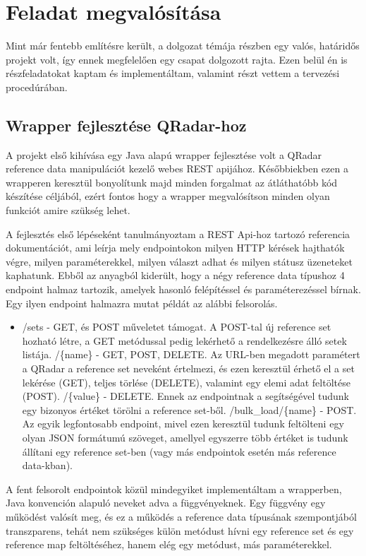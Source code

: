 \chapter{Feladat megvalósítása}
\label{ch:imp}
Mint már fentebb említésre került, a dolgozat témája részben egy valós, határidős projekt volt, így ennek megfelelően egy csapat dolgozott rajta. Ezen belül én is részfeladatokat kaptam és implementáltam, valamint részt vettem a tervezési procedúrában. 

\section{Wrapper fejlesztése QRadar-hoz}
A projekt első kihívása egy Java alapú wrapper fejlesztése volt a QRadar reference data manipulációt kezelő webes REST apijához. Későbbiekben ezen a wrapperen keresztül bonyolítunk majd minden forgalmat az átláthatóbb kód készítése céljából, ezért fontos hogy a wrapper megvalósítson minden olyan funkciót amire szükség lehet.

A fejlesztés első lépéseként tanulmányoztam a REST Api-hoz tartozó referencia dokumentációt, ami leírja mely endpointokon milyen HTTP kérések hajthatók végre, milyen paraméterekkel, milyen választ adhat és milyen státusz üzeneteket kaphatunk. Ebből az anyagból kiderült, hogy a négy reference data típushoz 4 endpoint halmaz tartozik, amelyek hasonló felépítéssel és paraméterezéssel bírnak. Egy ilyen endpoint halmazra mutat példát az alábbi felsorolás.

\begin{itemize}
	\item /sets - GET, és POST műveletet támogat. A POST-tal új reference set hozható létre, a GET metódussal pedig lekérhető a rendelkezésre álló setek listája.
		\subitem /\{name\} - GET, POST, DELETE. Az URL-ben megadott paramétert a QRadar a reference set neveként értelmezi, és ezen keresztül érhető el a set lekérése (GET), teljes törlése (DELETE), valamint egy elemi adat feltöltése (POST).
			\subsubitem /\{value\} - DELETE. Ennek az endpointnak a segítségével tudunk egy bizonyos értéket törölni a reference set-ből.
		\subitem /bulk\_load/\{name\} - POST. Az egyik legfontosabb endpoint, mivel ezen keresztül tudunk feltölteni egy olyan JSON formátumú szöveget, amellyel egyszerre több értéket is tudunk állítani egy reference set-ben (vagy más endpointok esetén más reference data-kban).
\end{itemize}

A fent felsorolt endpointok közül mindegyiket implementáltam a wrapperben, Java konvención alapuló neveket adva  a függvényeknek. Egy függvény egy működést valósít meg, és ez a működés a reference data típusának szempontjából transzparens, tehát nem szükséges külön metódust hívni egy reference set és egy reference map feltöltéséhez, hanem elég egy metódust, más paraméterekkel.

